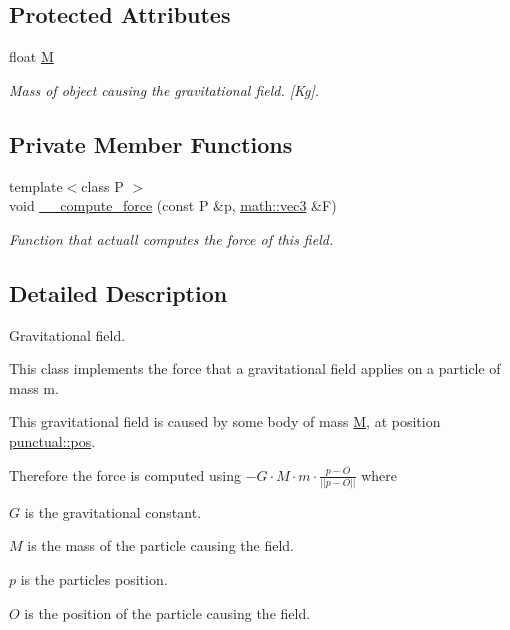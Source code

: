\subsection*{Protected Attributes}
\begin{DoxyCompactItemize}
\item 
\mbox{\label{classphysim_1_1fields_1_1gravitational_a0094aa217397b429bd807d6c630ec331}} 
float \hyperlink{classphysim_1_1fields_1_1gravitational_a0094aa217397b429bd807d6c630ec331}{M}
\begin{DoxyCompactList}\small\item\em Mass of object causing the gravitational field. \mbox{[}Kg\mbox{]}. \end{DoxyCompactList}\end{DoxyCompactItemize}
\subsection*{Private Member Functions}
\begin{DoxyCompactItemize}
\item 
{\footnotesize template$<$class P $>$ }\\void \hyperlink{classphysim_1_1fields_1_1gravitational_acb6baab17fcb3b3cbf61b6690bd935fd}{\+\_\+\+\_\+compute\+\_\+force} (const P \&p, \hyperlink{structphysim_1_1math_1_1vec3}{math\+::vec3} \&F)
\begin{DoxyCompactList}\small\item\em Function that actuall computes the force of this field. \end{DoxyCompactList}\end{DoxyCompactItemize}


\subsection{Detailed Description}
Gravitational field. 

This class implements the force that a gravitational field applies on a particle of mass m.

This gravitational field is caused by some body of mass \hyperlink{classphysim_1_1fields_1_1gravitational_a0094aa217397b429bd807d6c630ec331}{M}, at position \hyperlink{classphysim_1_1fields_1_1punctual_a00344d6f3e4f3f841e7d876918c66977}{punctual\+::pos}.

Therefore the force is computed using $-G \cdot M \cdot m \cdot \frac{p - O}{||p - O||}$ where
\begin{DoxyItemize}
\item $G$ is the gravitational constant.
\item $M$ is the mass of the particle causing the field.
\item $p$ is the particle\textquotesingle{}s position.
\item $O$ is the position of the particle causing the field. 
\end{DoxyItemize}

